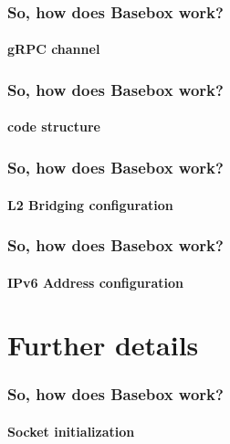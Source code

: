 \documentclass[11pt]{beamer}
\begin{document}
\begin{frame}
\frametitle{So, how does Basebox work?}
\framesubtitle{gRPC channel}


\end{frame}

\begin{frame}
\frametitle{So, how does Basebox work?}
\framesubtitle{code structure}


\end{frame}

\begin{frame}
\frametitle{So, how does Basebox work?}
\framesubtitle{L2 Bridging configuration}



\end{frame}

\begin{frame}
\frametitle{So, how does Basebox work?}
\framesubtitle{IPv6 Address configuration}


\end{frame}



\section{Further details}
\begin{frame}
\frametitle{So, how does Basebox work?}
\framesubtitle{Socket initialization}


\end{frame}




\end{document}
